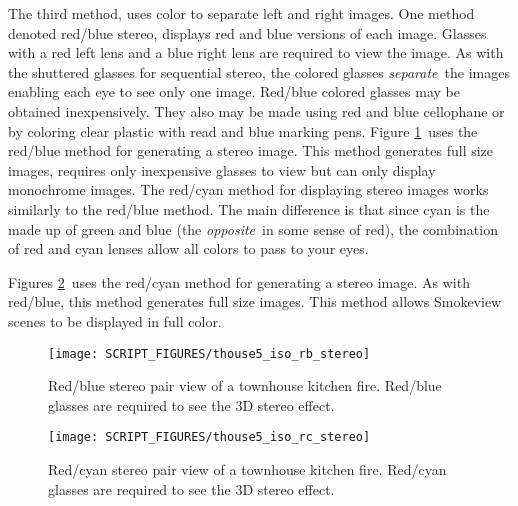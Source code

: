 \documentclass[11pt,twoside]{book}
\begin{document}
The third method, uses color to separate left and right images.
One method denoted red/blue stereo, displays red and blue versions
of each image.  Glasses with a red left lens and a blue right lens
are required to view the image.  As with the shuttered glasses for
sequential stereo, the colored glasses {\em separate}\ the images
enabling each eye to see only one image.  Red/blue colored glasses
may be obtained inexpensively. They also may be made using
red and blue cellophane or by coloring clear plastic with read and
blue marking pens.  Figure \ref{figrbstereo}\ uses the red/blue
method for generating a stereo image.  This method generates full
size images, requires only inexpensive glasses to view but can
only display monochrome images. The red/cyan method for displaying
stereo images works similarly to the red/blue method.  The main
difference is that since cyan is the made up of green and blue
(the {\em opposite}\ in some sense of red), the combination of red
and cyan lenses allow all colors to pass to your eyes.

Figures \ref{figrcstereo}\ uses the red/cyan method for generating
a stereo image.  As with red/blue, this method generates full size
images.  This method allows Smokeview
scenes to be displayed in full color.

\begin{figure}[bph]
\begin{center}
\texttt{[image: SCRIPT\_FIGURES/thouse5\_iso\_rb\_stereo]}
\caption[Red/blue stereo pair view of a townhouse kitchen fire.]{
Red/blue stereo pair view of a townhouse kitchen fire. Red/blue
glasses are required to see the 3D stereo effect. }
\label{figrbstereo}
\end{center}
\end{figure}

\begin{figure}[bph]
\begin{center}
\texttt{[image: SCRIPT\_FIGURES/thouse5\_iso\_rc\_stereo]}
\caption[Red/cyan stereo pair view of a townhouse kitchen fire.]{
Red/cyan stereo pair view of a townhouse kitchen fire. Red/cyan
glasses are required to see the 3D stereo effect. }
\label{figrcstereo}
\end{center}
\end{figure}
\end{document}
